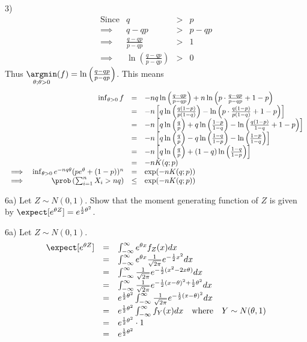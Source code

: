 \documentclass[11pt,a4paper]{article}
\begin{document}
\begin{answer}{3)}
\[\begin{array}{rrcl}
    \text{Since}&q&>&p\\
    \implies&q-qp&>&p-qp\\
    \implies&\frac{q-qp}{p-qp}&>&1\\
    \implies&\ln\left(\frac{q-qp}{p-qp}\right)&>&0
  \end{array}\]
  Thus $\underset{\theta;\theta>0}\argmin (f)=\ln\left(\frac{q-qp}{p-qp}\right)$. This means
  \[\begin{array}{rrcl}
    &\inf_{\theta>0}f&=&-nq\ln\left(\frac{q-qp}{p-qp}\right)+n\ln\left(p\cdot\frac{q-qp}{p-qp}+1-p\right)\\
    &&=&-n\left[q\ln\left(\frac{q(1-p)}{p(1-q)}\right)-\ln\left(p\cdot\frac{q(1-p)}{p(1-q)}+1-p\right)\right]\\
    &&=&-n\left[q\ln\left(\frac{q}p\right)+q\ln\left(\frac{1-p}{1-q}\right)-\ln\left(\frac{q(1-p)}{1-q}+1-p\right)\right]\\
    &&=&-n\left[q\ln\left(\frac{q}p\right)-q\ln\left(\frac{1-q}{1-p}\right)-\ln\left(\frac{1-p}{1-q}\right)\right]\\
    &&=&-n\left[q\ln\left(\frac{q}p\right)+(1-q)\ln\left(\frac{1-q}{1-p}\right)\right]\\
    &&=&-nK(q;p)\\
    \implies&\inf_{\theta>0}e^{-nq\theta}(pe^\theta+(1-p))^n&=&\exp(-nK(q;p))\\
    \implies&\prob\left(\sum_{i=1}^nX_i>nq\right)&\leq&\exp(-nK(q;p))
  \end{array}\]
\end{answer}

\begin{question}{6a)}
  Let $Z\sim N(0,1)$. Show that the moment generating function of $Z$ is given by $\expect[e^{\theta Z}]=e^{\frac12\theta^2}$.
\end{question}

\begin{answer}{6a)}
  Let $Z\sim N(0,1)$.
  \[\begin{array}{rcl}
    \expect[e^{\theta Z}]&=&\int_{-\infty}^\infty e^{\theta x}f_Z(x)dx\\
    &=&\int_{-\infty}^\infty e^{\theta x}\frac1{\sqrt{2\pi}}e^{-\frac12x^2}dx\\
    &=&\int_{-\infty}^\infty \frac1{\sqrt{2\pi}}e^{-\frac12(x^2-2x\theta)}dx\\
    &=&\int_{-\infty}^\infty \frac1{\sqrt{2\pi}}e^{-\frac12(x-\theta)^2+\frac12\theta^2}dx\\
    &=& e^{\frac12\theta^2}\int_{-\infty}^\infty \frac1{\sqrt{2\pi}}e^{-\frac12(x-\theta)^2}dx\\
    &=& e^{\frac12\theta^2}\int_{-\infty}^\infty f_Y(x)dx\quad\text{where}\quad Y\sim N(\theta,1)\\
    &=& e^{\frac12\theta^2}\cdot1\\
    &=& e^{\frac12\theta^2}
  \end{array}\]
\end{answer}
\end{document}

